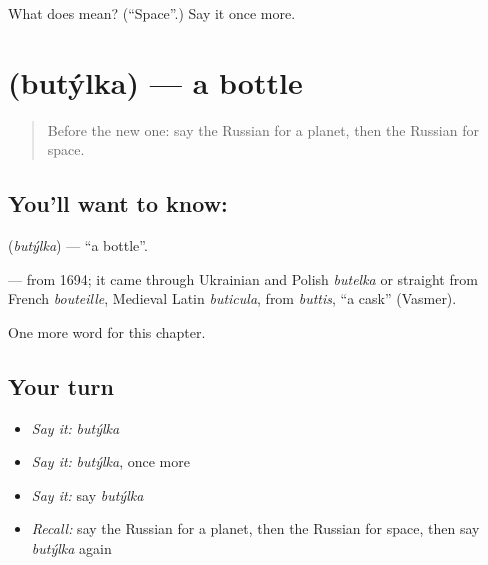\begin{tcolorbox}[breakable,colback=teal!4,colframe=teal!35!black,title={Before you move on}]
What does  mean? (\textquotedblleft{}Space\textquotedblright{}.) Say it once more.
\end{tcolorbox}
\section[\texorpdfstring{\ru{бутылка} (butýlka)}{бутылка (butýlka)}]{ (butýlka) — a bottle}

\label{lesson:RU-C123-bottle}



\begin{quote}
Before the new one: say the Russian for a planet, then the Russian for space.
\end{quote}

\subsection*{You'll want to know: }
\textbf{} (\emph{butýlka}) — \textquotedblleft{}a bottle\textquotedblright{}.

\begin{cousinweb}
\textbf{} — from 1694; it came through Ukrainian and Polish \emph{butelka} or straight from French \emph{bouteille}, Medieval Latin \emph{buticula}, from \emph{buttis}, \textquotedblleft{}a cask\textquotedblright{} (Vasmer).
\end{cousinweb}

\begin{grammarlens}[title={What you've built}]
One more word for this chapter.
\end{grammarlens}

\subsection*{Your turn}
\begin{itemize}
\raggedright
  \item \emph{Say it:} \emph{butýlka}
  \item \emph{Say it:} \emph{butýlka}, once more
  \item \emph{Say it:} say \emph{butýlka}
  \item \emph{Recall:} say the Russian for a planet, then the Russian for space, then say \emph{butýlka} again
\end{itemize}

